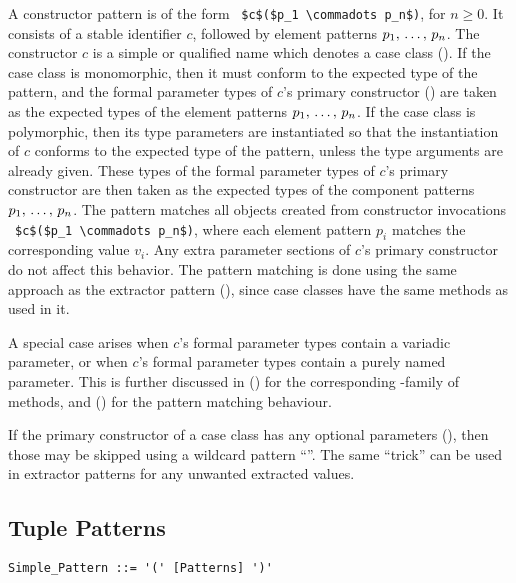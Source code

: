 A constructor pattern is of the form ~\lstinline!$c$($p_1 \commadots p_n$)!, for $n \geq 0$. It consists of a stable identifier $c$, followed by element patterns $p_1 ,\, \ldots ,\, p_n$. The constructor $c$ is a simple or qualified name which denotes a case class (). If the case class is monomorphic, then it must conform to the expected type of the pattern, and the formal parameter types of $c$'s primary constructor () are taken as the expected types of the element patterns $p_1 ,\, \ldots ,\, p_n$. If the case class is polymorphic, then its type parameters are instantiated so that the instantiation of $c$ conforms to the expected type of the pattern, unless the type arguments are already given. These types of the formal parameter types of $c$'s primary constructor are then taken as the expected types of the component patterns $p_1 ,\, \ldots ,\, p_n$. The pattern matches all objects created from constructor invocations ~\lstinline!$c$($p_1 \commadots p_n$)!, where each element pattern $p_i$ matches the corresponding value $v_i$. Any extra parameter sections of $c$'s primary constructor do not affect this behavior. The pattern matching is done using the same approach as the extractor pattern (), since case classes have the same  methods as used in it. 

A special case arises when $c$'s formal parameter types contain a variadic parameter, or when $c$'s formal parameter types contain a purely named parameter. This is further discussed in () for the corresponding -family of methods, and () for the pattern matching behaviour. 

If the primary constructor of a case class has any optional parameters (), then those may be skipped using a wildcard pattern ``\code{_}''. The same ``trick'' can be used in extractor patterns for any unwanted extracted values. 






\subsection{Tuple Patterns}
\label{sec:tuple-patterns}

\syntax\begin{lstlisting}
Simple_Pattern ::= '(' [Patterns] ')'
\end{lstlisting}

